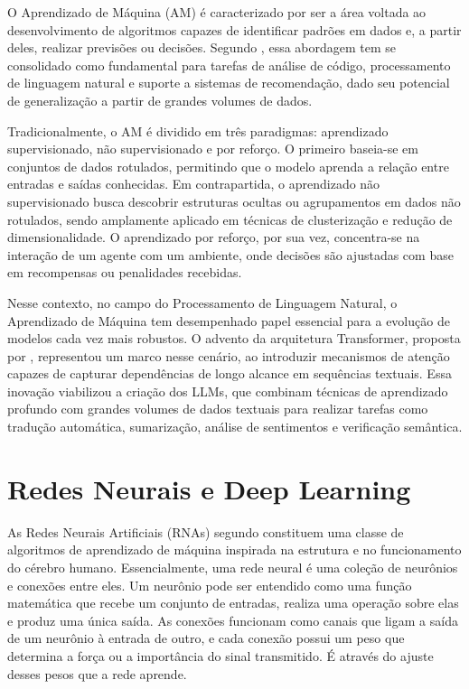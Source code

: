 
O Aprendizado de Máquina (AM) é caracterizado por ser a área voltada ao desenvolvimento de algoritmos capazes de identificar padrões em dados e, a partir deles, realizar previsões ou decisões. Segundo , essa abordagem tem se consolidado como fundamental para tarefas de análise de código, processamento de linguagem natural e suporte a sistemas de recomendação, dado seu potencial de generalização a partir de grandes volumes de dados.

Tradicionalmente, o AM é dividido em três paradigmas: aprendizado supervisionado, não supervisionado e por reforço. O primeiro baseia-se em conjuntos de dados rotulados, permitindo que o modelo aprenda a relação entre entradas e saídas conhecidas. Em contrapartida, o aprendizado não supervisionado busca descobrir estruturas ocultas ou agrupamentos em dados não rotulados, sendo amplamente aplicado em técnicas de clusterização e redução de dimensionalidade. O aprendizado por reforço, por sua vez, concentra-se na interação de um agente com um ambiente, onde decisões são ajustadas com base em recompensas ou penalidades recebidas.

Nesse contexto, no campo do Processamento de Linguagem Natural, o Aprendizado de Máquina tem desempenhado papel essencial para a evolução de modelos cada vez mais robustos. O advento da arquitetura Transformer, proposta por , representou um marco nesse cenário, ao introduzir mecanismos de atenção capazes de capturar dependências de longo alcance em sequências textuais. Essa inovação viabilizou a criação dos LLMs, que combinam técnicas de aprendizado profundo com grandes volumes de dados textuais para realizar tarefas como tradução automática, sumarização, análise de sentimentos e verificação semântica.

\section{Redes Neurais e Deep Learning}

As Redes Neurais Artificiais (RNAs) segundo   constituem uma classe de algoritmos de aprendizado de máquina inspirada na estrutura e no funcionamento do cérebro humano. Essencialmente, uma rede neural é uma coleção de neurônios e conexões entre eles. Um neurônio pode ser entendido como uma função matemática que recebe um conjunto de entradas, realiza uma operação sobre elas e produz uma única saída. As conexões funcionam como canais que ligam a saída de um neurônio à entrada de outro, e cada conexão possui um peso que determina a força ou a importância do sinal transmitido. É através do ajuste desses pesos que a rede aprende.


